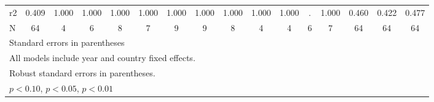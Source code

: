 \begin{table}[htbp]
\begin{tabular}{l*{15}{c}}
\midrule
r2        &    0.409         &    1.000         &    1.000         &    1.000         &    1.000         &    1.000         &    1.000         &    1.000         &    1.000         &    1.000         &        .         &    1.000         &    0.460         &    0.422         &    0.477         \\
N         &       64         &        4         &        6         &        8         &        7         &        9         &        9         &        8         &        4         &        4         &        6         &        7         &       64         &       64         &       64         \\
\bottomrule
\multicolumn{16}{l}{\footnotesize Standard errors in parentheses}\\
\multicolumn{16}{l}{\footnotesize All models include year and country fixed effects.}\\
\multicolumn{16}{l}{\footnotesize Robust standard errors in parentheses.}\\
\multicolumn{16}{l}{\footnotesize \sym{*} \(p<0.10\), \sym{**} \(p<0.05\), \sym{***} \(p<0.01\)}\\
\end{tabular}
\end{table}
